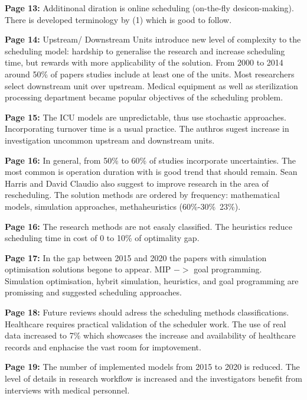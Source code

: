    \textbf{Page 13:}
    Additinonal diration is online scheduling (on-the-fly desicon-making). There is developed terminology by (1) which is good to follow.
    
    \textbf{Page 14:}
    Upstream/ Downstream Units introduce new level of complexity to the scheduling model: hardship to generalise the research and increase scheduling time, but rewards with more applicability of the solution. From 2000 to 2014 around 50\% of papers studies include at least one of the units. Most researchers select downstream unit over upstream. Medical equipment as well as sterilization processing department became popular objectives of the scheduling problem.
    
    \textbf{Page 15:}
    The ICU models are unpredictable, thus use stochastic approaches. Incorporating turnover time is a usual practice. The authros sugest increase in investigation uncommon upstream and downstream units.

    \textbf{Page 16:}
    In general, from 50\% to 60\% of studies incorporate uncertainties. The most common is operation duration with is good trend that should remain. Sean Harris and David Claudio also suggest to improve research in the area of rescheduling. The solution methods are ordered by frequency: mathematical models, simulation approaches, methaheuristics (60\%-30\%~23\%).

    \textbf{Page 16:}
    The research methods are not easaly classified. The heuristics reduce scheduling time in cost of 0 to 10\% of optimality gap.
    
    \textbf{Page 17:}
    In the gap between 2015 and 2020 the papers with simulation optimisation solutions begone to appear. MIP $->$ goal programming. Simulation optimisation, hybrit simulation, heuristics, and goal programming are promissing and suggested scheduling approaches.
    
    \textbf{Page 18:}
    Future reviews should adress the scheduling methods classifications. Healthcare requires practical validation of the scheduler work. The use of real data increased to 7\% which showcases the increase and availability of healthcare records and enphacise the vast room for imptovement.
    
    \textbf{Page 19:}
    The number of implemented models from 2015 to 2020 is reduced. The level of details in research workflow is increased and the investigators benefit from interviews with medical personnel.
    
